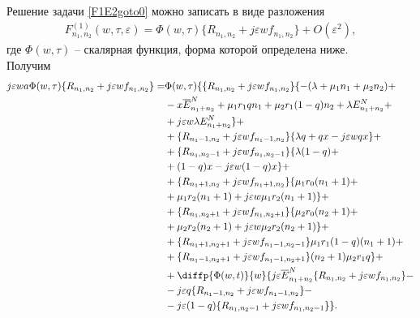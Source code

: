 Решение задачи \eqref{F1E2goto0} можно записать в виде разложения
\begin{align}\label{expansionF}
F_{n_{1}, n_{2}}^{(1)}(w,\tau,\varepsilon)=\Phi (w,\tau)\{R_{n_{1}, n_{2}}+j\varepsilon w f_{n_{1}, n_{2}}\}+O(\varepsilon^2),
\end{align}
где $\Phi (w,\tau)$ -- скалярная функция, форма которой определена ниже. \\
\hspace*{\parindent}%
Получим \\
 \begin{equation}
	\begin{split}
		j\varepsilon wa \Phi (w,\tau)\{R_{n_{1}, n_{2}}+j\varepsilon w f_{n_{1}, n_{2}}\}=
		&\Phi (w,\tau)\{\{R_{n_{1}, n_{2}}+j\varepsilon w f_{n_{1}, n_{2}}\}\{-(\lambda+\mu_{1}n_{1}+\mu_{2}n_{2}) +\\
		&-x\overline{E}_{n_{1}+n_{2}}^N+\mu_{1}r_{1}q n_{1}+ \mu_{2}r_{1}(1-q)n_{2}+ \lambda E_{n_{1}+n_{2}}^N+\\
		& +j\varepsilon w \lambda E_{n_{1}+n_{2}}^N \}+\\
		&+\{R_{n_{1}-1, n_{2}}+j\varepsilon w f_{n_{1}-1, n_{2}}\}\{\lambda q+ q  x-j\varepsilon wq x\}+\\
		&+\{R_{n_{1}, n_{2}-1}+j\varepsilon w f_{n_{1}, n_{2}-1}\}\{\lambda (1-q)+\\
		&+ (1-q) x -j\varepsilon w(1-q) x \}+\\
		&+ \{R_{n_{1}+1, n_{2}}+j\varepsilon w f_{n_{1}+1, n_{2}}\}\{\mu_{1} r_{0}(n_{1}+1)+\\
		& + \mu_{1} r_{2}(n_{1}+1)+j\varepsilon w\mu_{1} r_{2}(n_{1}+1)\}+\\
		&+ \{R_{n_{1}, n_{2}+1}+j\varepsilon w f_{n_{1}, n_{2}+1}\}\{\mu_{2} r_{0}(n_{2}+1)+\\
		& + \mu_{2} r_{2} (n_{2}+1) +j\varepsilon w\mu_{2} r_{2} (n_{2}+1)\}+\\
		&+\{R_{n_{1}+1, n_{2}+1}+j\varepsilon w f_{n_{1}-1, n_{2}-1}\}\mu_{1} r_{1}(1-q)(n_{1}+1) +\\
		&+\{R_{n_{1}-1, n_{2}+1}+j\varepsilon w f_{n_{1}-1, n_{2}+1}\}(n_{2}+1)\mu_{2} r_{1}q\}  +\\
		&+ \diffp{\Phi(w,t)}{w}\{j\varepsilon \overline{E}_{n_{1}+n_{2}}^N\{R_{n_{1}, n_{2}}+j\varepsilon w f_{n_{1}, n_{2}}\}-\\
		&-  j\varepsilon q  \{R_{n_{1}-1, n_{2}}+j\varepsilon w f_{n_{1}-1, n_{2}}\}-\\
		&- j \varepsilon (1-q) \{R_{n_{1}, n_{2}-1}+j\varepsilon w f_{n_{1}, n_{2}-1}\}\}.
	\end{split}
\end{equation}
